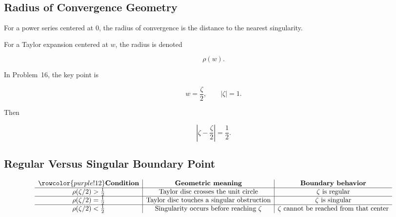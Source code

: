 \documentclass[12pt,a4paper]{article}
\theoremstyle{notespace}
\begin{document}
\subsection{Radius of Convergence Geometry}

For a power series centered at \(0\), the radius of convergence is the distance to the nearest singularity.

For a Taylor expansion centered at \(w\), the radius is denoted

\[
\rho(w).
\]

In Problem~16, the key point is

\[
w=\frac{\zeta}{2},
\qquad
|\zeta|=1.
\]

Then

\[
\left|\zeta-\frac{\zeta}{2}\right|=\frac12.
\]

\begin{center}
\end{center}

\subsection{Regular Versus Singular Boundary Point}

\[
\begin{array}{c|c|c}
	\rowcolor{purple!12}
	\textbf{Condition} &
	\textbf{Geometric meaning} &
	\textbf{Boundary behavior}
	\\
	\hline
	\rho(\zeta/2)>\frac12
	&
	\text{Taylor disc crosses the unit circle}
	&
	\text{\(\zeta\) is regular}
	\\
	\hline
	\rho(\zeta/2)=\frac12
	&
	\text{Taylor disc touches a singular obstruction}
	&
	\text{\(\zeta\) is singular}
	\\
	\hline
	\rho(\zeta/2)<\frac12
	&
	\text{Singularity occurs before reaching \(\zeta\)}
	&
	\text{\(\zeta\) cannot be reached from that center}
\end{array}
\]
\end{document}
